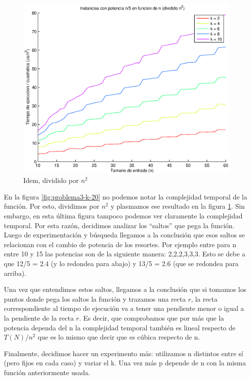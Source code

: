 \begin{figure}[H]
\begin{minipage}{0.5\linewidth}
    \includegraphics[width=\linewidth]{img/problema3/instancia_p_20p_varios_k_div_n2.eps}
    \caption{Idem, dividido por $n^2$}\label{fig:problema3-k-n2-20}
  \end{minipage}	
\end{figure}

En la figura \ref{fig:problema3-k-20} no podemos notar la complejidad temporal de la función. Por esto, dividimos por $n^2$ y plasmamos ese resultado en la figura \ref{fig:problema3-k-n2-20}. Sin embargo, en esta última figura tampoco podemos ver claramente la complejidad temporal. Por esta razón, decidimos analizar los ``saltos'' que pega la función. Luego de experimentación y búsqueda llegamos a la conclusión que esos saltos se relacionan con el cambio de potencia de los resortes. Por ejemplo entre para n entre 10 y 15 las potencias son de la siguiente manera: 2,2,2,3,3,3. Esto se debe a que 12/5 = 2.4 (y lo redondea para abajo) y 13/5 = 2.6 (que se redondea para arriba).

Una vez que entendimos estos saltos, llegamos a la conclusión que si tomamos los puntos donde pega los saltos la función y trazamos una recta $r$, la recta correspondiente al tiempo de ejecución va a tener una pendiente menor o igual a la pendiente de la recta $r$. Es decir, que comprobamos que por más que la potencia dependa del n la complejidad temporal también es lineal respecto de $T(N)/n^2$ que es lo mismo que decir que es cúbica respecto de n.

Finalmente, decidimos hacer un experimento más: utilizamos n distintos entre sí (pero fijos en cada caso) y variar el k. Una vez más p depende de n con la misma función anteriormente usada.


